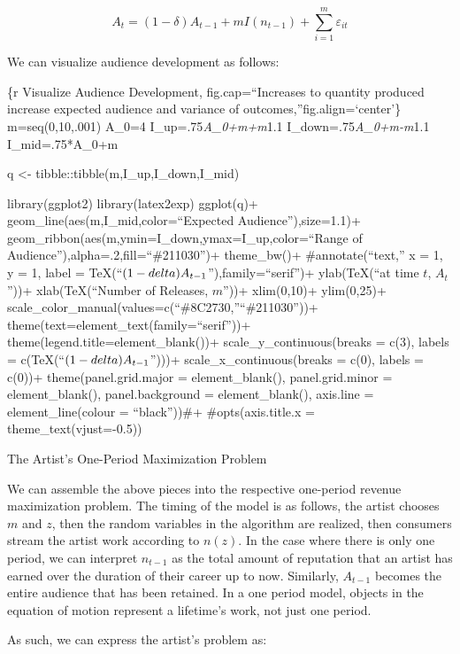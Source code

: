 \documentclass[
]{article}
\begin{document}
\begin{equation} \label{eq:eqn_of_motion}
A_t=(1-\delta)A_{t-1}+mI(n_{t-1})+\sum_{i=1}^m\varepsilon_{it}
\end{equation}

We can visualize audience development as follows:

\{r Visualize Audience Development, fig.cap=``Increases to quantity
produced increase expected audience and variance of
outcomes,''fig.align=`center'\} m=seq(0,10,.001) A\_0=4
I\_up=.75\emph{A\_0+m+m}1.1 I\_down=.75\emph{A\_0+m-m}1.1
I\_mid=.75*A\_0+m

q \textless- tibble::tibble(m,I\_up,I\_down,I\_mid)

library(ggplot2) library(latex2exp) ggplot(q)+
geom\_line(aes(m,I\_mid,color=``Expected Audience''),size=1.1)+
geom\_ribbon(aes(m,ymin=I\_down,ymax=I\_up,color=``Range of
Audience''),alpha=.2,fill=``\#211030'')+ theme\_bw()+
\#annotate(``text,'' x = 1, y = 1, label =
TeX(``\((1-\\delta)A_{t-1}\)''),family=``serif'')+
ylab(TeX(``\nAudience at time \(t\), \(A_t\)''))+ xlab(TeX(``Number of
Releases, \(m\)''))+ xlim(0,10)+ ylim(0,25)+
scale\_color\_manual(values=c(``\#8C2730,''``\#211030''))+
theme(text=element\_text(family=``serif''))+
theme(legend.title=element\_blank())+ scale\_y\_continuous(breaks =
c(3), labels = c(TeX(``\((1-\\delta)A_{t-1}\)'')))+
scale\_x\_continuous(breaks = c(0), labels = c(0))+
theme(panel.grid.major = element\_blank(), panel.grid.minor =
element\_blank(), panel.background = element\_blank(), axis.line =
element\_line(colour = ``black''))\#+ \#opts(axis.title.x =
theme\_text(vjust=-0.5))

The Artist's One-Period Maximization Problem

We can assemble the above pieces into the respective one-period revenue
maximization problem. The timing of the model is as follows, the artist
chooses \(m\) and \(z\), then the random variables in the algorithm are
realized, then consumers stream the artist work according to \(n(z)\).
In the case where there is only one period, we can interpret \(n_{t-1}\)
as the total amount of reputation that an artist has earned over the
duration of their career up to now. Similarly, \(A_{t-1}\) becomes the
entire audience that has been retained. In a one period model, objects
in the equation of motion represent a lifetime's work, not just one
period.

As such, we can express the artist's problem as:
\end{document}
